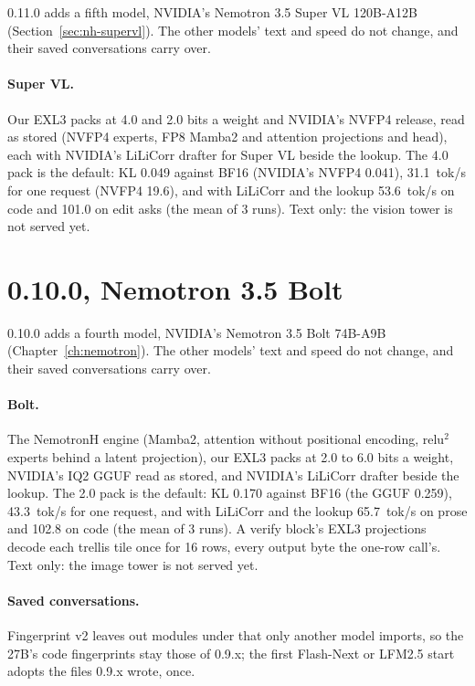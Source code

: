 0.11.0 adds a fifth model, NVIDIA's Nemotron 3.5 Super VL 120B-A12B (Section~\ref{sec:nh-supervl}). The other models' text and speed do not change, and their saved conversations carry over.

\paragraph{Super VL.} Our EXL3 packs at 4.0 and 2.0 bits a weight and NVIDIA's NVFP4 release, read as stored (NVFP4 experts, FP8 Mamba2 and attention projections and head), each with NVIDIA's LiLiCorr drafter for Super VL beside the lookup. The 4.0 pack is the default: KL 0.049 against BF16 (NVIDIA's NVFP4 0.041), 31.1~tok/s for one request (NVFP4 19.6), and with LiLiCorr and the lookup 53.6~tok/s on code and 101.0 on edit asks (the mean of 3 runs). Text only: the vision tower is not served yet.

\section{0.10.0, Nemotron 3.5 Bolt}\label{sec:changelog-0100}

0.10.0 adds a fourth model, NVIDIA's Nemotron 3.5 Bolt 74B-A9B (Chapter~\ref{ch:nemotron}). The other models' text and speed do not change, and their saved conversations carry over.

\paragraph{Bolt.} The NemotronH engine (Mamba2, attention without positional encoding, relu$^2$ experts behind a latent projection), our EXL3 packs at 2.0 to 6.0 bits a weight, NVIDIA's IQ2 GGUF read as stored, and NVIDIA's LiLiCorr drafter beside the lookup. The 2.0 pack is the default: KL 0.170 against BF16 (the GGUF 0.259), 43.3~tok/s for one request, and with LiLiCorr and the lookup 65.7~tok/s on prose and 102.8 on code (the mean of 3 runs). A verify block's EXL3 projections decode each trellis tile once for 16 rows, every output byte the one-row call's. Text only: the image tower is not served yet.

\paragraph{Saved conversations.} Fingerprint v2 leaves out modules under  that only another model imports, so the 27B's code fingerprints stay those of 0.9.x; the first Flash-Next or LFM2.5 start adopts the files 0.9.x wrote, once.

